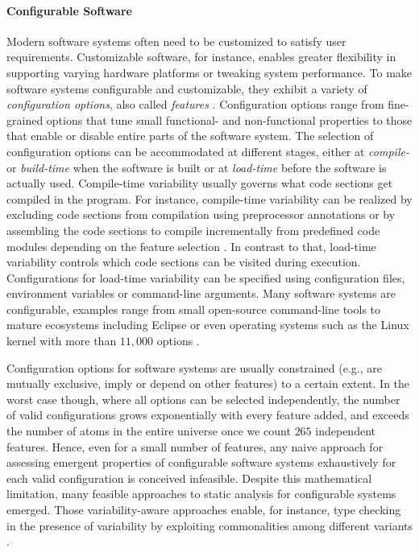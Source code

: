 \paragraph{Configurable Software}
Modern software systems often need to
be customized to satisfy user requirements. Customizable software, for instance,
enables greater flexibility in supporting varying hardware platforms or tweaking
system performance. To make software systems configurable and customizable, they
exhibit a variety of \emph{configuration options}, also called
\emph{features} \citep{apel_feature-oriented_2013}.
Configuration options range from fine-grained options that tune small
functional- and non-functional properties to those that enable or disable entire
parts of the software system. The selection of configuration options can be
accommodated at different stages, either at \emph{compile-} or \emph{build-time}
when the software is built or at \emph{load-time} before the software is actually used.
Compile-time variability usually governs what code sections get
compiled in the program. For instance, compile-time variability can be
realized by excluding code sections from compilation using preprocessor
annotations \citep{hunsen_preprocessor-based_2016} or by assembling the code
sections to compile incrementally from predefined code modules depending on the
feature selection \citep{schaefer_delta-oriented_2010}. In contrast to that,
load-time variability controls which code sections can be visited during execution. Configurations for
load-time variability can be specified using
configuration files, environment variables or command-line arguments.
Many software systems are configurable, examples range from small open-source
command-line tools to mature ecosystems including Eclipse or even operating
systems such as the Linux kernel with more than $11,000$ options \citep{dietrich_robust_2012}.

Configuration options for
software systems are usually constrained (e.g., are mutually exclusive, imply
or depend on other features) to a certain extent. In the worst case though,
where all options can be selected independently, the number of valid
configurations grows exponentially with every feature added, and exceeds
the number of atoms in the entire universe once we count $265$ independent
features. Hence, even for a small number of features, any naive approach for
assessing emergent properties of configurable software systems exhaustively for
each valid configuration is conceived infeasible. Despite this
mathematical limitation, many feasible approaches to static analysis for
configurable systems emerged. Those variability-aware approaches enable, for
instance, type checking in the presence of variability by exploiting
commonalities among different variants \citep{thum_classification_2014}.

